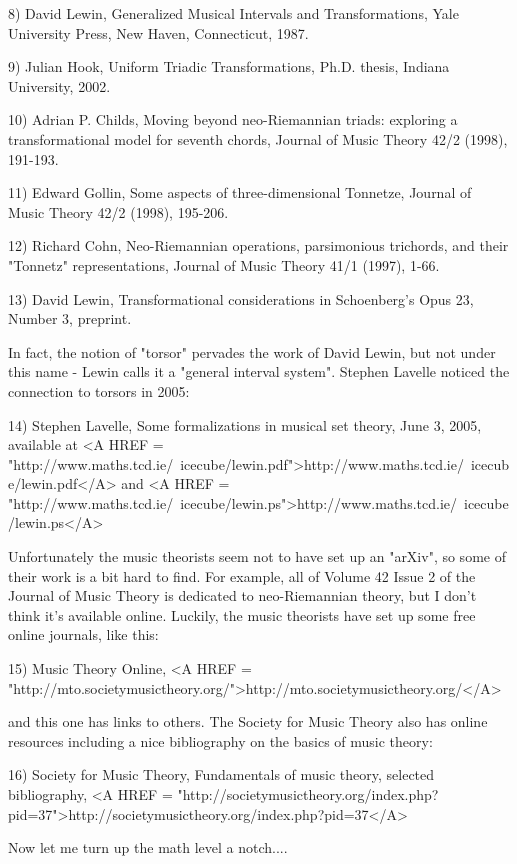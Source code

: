 8) David Lewin, Generalized Musical Intervals and Transformations,
Yale University Press, New Haven, Connecticut, 1987.

9) Julian Hook, Uniform Triadic Transformations, Ph.D. thesis, Indiana 
University, 2002.

10) Adrian P. Childs, Moving beyond neo-Riemannian triads: exploring 
a transformational model for seventh chords, Journal of Music
Theory 42/2 (1998), 191-193.

11) Edward Gollin, Some aspects of three-dimensional Tonnetze,
Journal of Music Theory 42/2 (1998), 195-206.

12) Richard Cohn, Neo-Riemannian operations, parsimonious 
trichords, and their "Tonnetz" representations, Journal of 
Music Theory 41/1 (1997), 1-66.

13) David Lewin, Transformational considerations in Schoenberg's 
Opus 23, Number 3, preprint. 

In fact, the notion of "torsor" pervades the work of David
Lewin, but not under this name - Lewin calls it a "general
interval system".  Stephen Lavelle noticed the connection to
torsors in 2005:

14) Stephen Lavelle, Some formalizations in musical set theory,
June 3, 2005, available at <A HREF = "http://www.maths.tcd.ie/~icecube/lewin.pdf">http://www.maths.tcd.ie/~icecube/lewin.pdf</A>
and <A HREF = "http://www.maths.tcd.ie/~icecube/lewin.ps">http://www.maths.tcd.ie/~icecube/lewin.ps</A>

Unfortunately the music theorists seem not to have set up 
an "arXiv", so some of their work is a bit hard to find.
For example, all of Volume 42 Issue 2 of the Journal of Music 
Theory is dedicated to neo-Riemannian theory, but I don't
think it's available online.  Luckily, the music theorists have 
set up some free online journals, like this:

15) Music Theory Online, <A HREF = "http://mto.societymusictheory.org/">http://mto.societymusictheory.org/</A>

and this one has links to others.  The Society for Music Theory 
also has online resources including a nice bibliography on the 
basics of music theory:

16) Society for Music Theory, Fundamentals of music theory,
selected bibliography, 
<A HREF = "http://societymusictheory.org/index.php?pid=37">http://societymusictheory.org/index.php?pid=37</A>

Now let me turn up the math level a notch....

